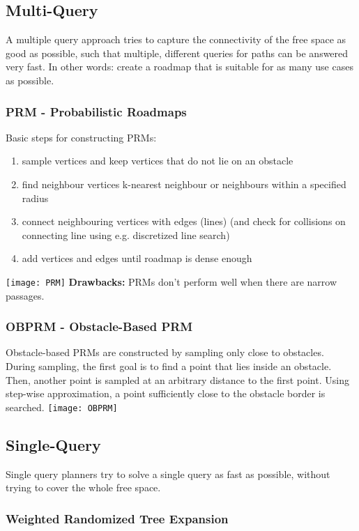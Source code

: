 \begin{multicols*}{2}
\subsection{Multi-Query}
A multiple query approach tries to capture the connectivity of the free space as good as possible, such that multiple, different queries for paths can be answered very fast. In other words: create a roadmap that is suitable for as many use cases as possible.

\subsubsection{PRM - Probabilistic Roadmaps}
Basic steps for constructing PRMs:
\begin{enumerate}
	\item sample vertices and keep vertices that do not lie on an obstacle
	\item find neighbour vertices
		\subitem k-nearest neighbour or
		\subitem neighbours within a specified radius
	\item connect neighbouring vertices with edges (lines) (and check for collisions on connecting line using e.g. discretized line search)
	\item add vertices and edges until roadmap is dense
enough
\end{enumerate}
\texttt{[image: PRM]}
\textbf{Drawbacks: } PRMs don't perform well when there are narrow passages.

\subsubsection{OBPRM - Obstacle-Based PRM}
Obstacle-based PRMs are constructed by sampling only close to obstacles. During sampling, the first goal is to find a point that lies inside an obstacle. Then, another point is sampled at an arbitrary distance to the first point. Using step-wise approximation, a point sufficiently close to the obstacle border is searched.
\texttt{[image: OBPRM]}

\subsection{Single-Query}
Single query planners try to solve a single query as fast as possible, without trying to cover the whole free space.

\subsubsection{Weighted Randomized Tree Expansion}


\end{multicols*}
